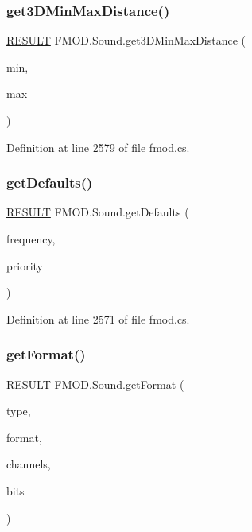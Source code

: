 \subsubsection{\texorpdfstring{get3\+D\+Min\+Max\+Distance()}{get3DMinMaxDistance()}}
{\footnotesize\ttfamily \hyperlink{namespace_f_m_o_d_a305d1176ef3f8c8815861a60407ac33d}{R\+E\+S\+U\+LT} F\+M\+O\+D.\+Sound.\+get3\+D\+Min\+Max\+Distance (\begin{DoxyParamCaption}\item[{out float}]{min,  }\item[{out float}]{max }\end{DoxyParamCaption})}



Definition at line 2579 of file fmod.\+cs.

\mbox{\label{class_f_m_o_d_1_1_sound_aa1ab1d7631c888c1e58e4ee53e947ff9}} 
\subsubsection{\texorpdfstring{get\+Defaults()}{getDefaults()}}
{\footnotesize\ttfamily \hyperlink{namespace_f_m_o_d_a305d1176ef3f8c8815861a60407ac33d}{R\+E\+S\+U\+LT} F\+M\+O\+D.\+Sound.\+get\+Defaults (\begin{DoxyParamCaption}\item[{out float}]{frequency,  }\item[{out int}]{priority }\end{DoxyParamCaption})}



Definition at line 2571 of file fmod.\+cs.

\mbox{\label{class_f_m_o_d_1_1_sound_ac5fb06924194ded5e5687fc1e511b777}} 
\subsubsection{\texorpdfstring{get\+Format()}{getFormat()}}
{\footnotesize\ttfamily \hyperlink{namespace_f_m_o_d_a305d1176ef3f8c8815861a60407ac33d}{R\+E\+S\+U\+LT} F\+M\+O\+D.\+Sound.\+get\+Format (\begin{DoxyParamCaption}\item[{out \hyperlink{namespace_f_m_o_d_a46aa34a9d7b9a92de83721cd8fbfa028}{S\+O\+U\+N\+D\+\_\+\+T\+Y\+PE}}]{type,  }\item[{out \hyperlink{namespace_f_m_o_d_a06713fa43379f081fa76373fa12b8d7d}{S\+O\+U\+N\+D\+\_\+\+F\+O\+R\+M\+AT}}]{format,  }\item[{out int}]{channels,  }\item[{out int}]{bits }\end{DoxyParamCaption})}



